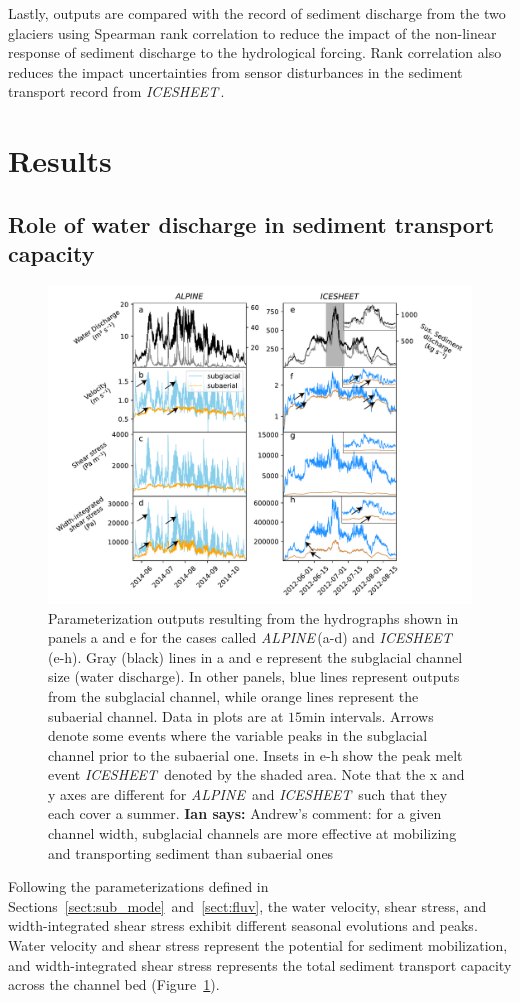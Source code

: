 \documentclass[11pt]{article}
\newcommand{\ian}[1]{{\textbf{\color{blue}Ian says:} \color{blue} #1} }
\newcommand{\alpine}{\textit{ALPINE}\,}
\newcommand{\icesheet}{\textit{ICESHEET}\,}
\newcommand{\unit}[1]{$\mathrm{#1}$}
\begin{document}
Lastly,  outputs are compared with the record of sediment discharge from the two glaciers using Spearman rank correlation to reduce the impact of the non-linear response of sediment discharge to the hydrological forcing.
Rank correlation also reduces the impact uncertainties from sensor disturbances in the sediment transport record from \icesheet{}.

\section{Results}

\subsection{Role of water discharge in sediment transport capacity}
\begin{figure}[h]
  \centering
  \includegraphics[width=0.9\linewidth]{Fig2.pdf}
  \caption{Parameterization outputs resulting from the hydrographs shown in panels a and e for the cases called \alpine (a-d) and \icesheet{} (e-h). Gray (black) lines in a and e represent the subglacial channel size (water discharge).  In other panels, blue lines represent outputs from the subglacial channel, while orange lines represent the subaerial channel.
    Data in plots are at $15$\unit{min} intervals.
    Arrows denote some events where the variable peaks in the subglacial channel prior to the subaerial one.
    Insets in e-h show the  peak melt event \icesheet{} denoted by the shaded area.
    Note that the x and y axes are different for \alpine{} and \icesheet{} such that they each cover a summer.
    \ian{Andrew's comment: for a given channel width, subglacial channels are more effective at mobilizing and transporting sediment than subaerial ones}
  } 
  \label{fig:model_outs}
\end{figure}
Following the parameterizations defined in Sections~\ref{sect:sub_mode}~and~\ref{sect:fluv}, the water velocity, shear stress, and width-integrated shear stress exhibit different seasonal evolutions and peaks. Water velocity and shear stress represent the potential for sediment mobilization, and width-integrated shear stress represents the total sediment transport capacity across the channel bed (Figure~\ref{fig:model_outs}).
\end{document}
